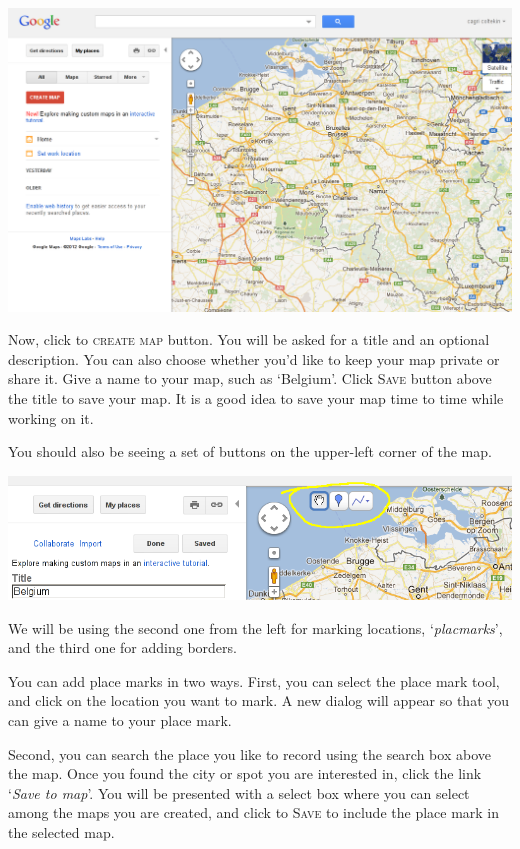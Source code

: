 \documentclass{article}
\begin{document}
\begin{center}
\includegraphics[width=\textwidth]{images/google-maps-start.png}
\end{center}

Now, click to \textsc{create map} button. You will be asked for a
title and an optional description. You can also choose whether you'd
like to keep your map private or share it. Give a name to your map,
such as `Belgium'. Click \textsc{Save} button above the title to save
your map. It is a good idea to save your map time to time while
working on it.

You should also be seeing a set of buttons on the upper-left corner of
the map.

\begin{center}
\includegraphics[width=\textwidth]{images/google-maps-tools.png}
\end{center}

We will be using the second one from the left for marking locations,
`\emph{placmarks}', and the third one for adding borders.

You can add place marks in two ways. First, you can select the place
mark tool, and click on the location you want to mark. A new dialog
will appear so that you can give a name to your place mark. 

Second, you can search the place you like to record using the search
box above the map. Once you found the city or spot you are interested
in, click the link `\emph{Save to map}'. You will be presented with a
select box where you can select among the maps you are created, and
click to \textsc{Save} to include the place mark in the selected map.
\end{document}
